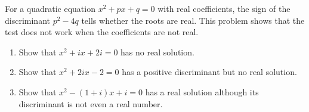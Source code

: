 For a quadratic equation $x^2+px+q=0$ with real coefficients, the sign of the discriminant $p^2-4q$ tells whether the roots are real. This problem shows that the test does not work when the coefficients are not real.
\begin{enumerate}
\item[(a)] Show that $x^2+ix+2i=0$ has no real solution.
\item[(b)] Show that $x^2+2ix-2=0$ has a positive discriminant but no real solution.
\item[(c)] Show that $x^2-(1+i)x+i=0$ has a real solution although its discriminant is not even a real number.
\end{enumerate}

